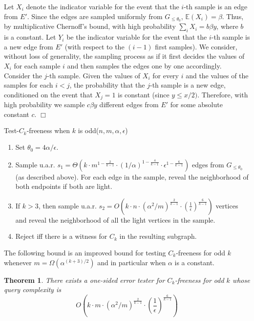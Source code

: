 \documentclass{article}
\newcommand{\Ex}{\mathbb{E}}
\newenvironment{proof}{\smallskip\noindent{\bf Proof:}}%
        {\hspace*{\fill}$\Box$\par}
\newtheorem{theorem}{Theorem}
\begin{document}
\begin{proof}
    Let $X_i$ denote the indicator variable for the event that the $i$-th sample is an edge from $E'$. Since the edges are sampled uniformly from $G_{\leq \theta_0}$, $\Ex(X_i) = \beta$.
    Thus, by multiplicative Chernoff's bound, with high probability $\sum_i X_i = b \beta y$, where $b$ is a constant.
    Let $Y_i$ be the indicator variable for the event that the $i$-th sample is a new edge from $E'$ (with respect to the $(i-1)$ first samples).
    We consider, without loss of generality, the sampling process as if it first decides the values of $X_i$ for each sample $i$ and then samples the edges one by one accordingly.
    Consider the $j$-th sample.
    Given the values of $X_i$ for every $i$ and the values of the samples for each $i < j$, the probability that the $j$-th sample is a new edge, conditioned on the event that $X_j = 1$ is constant (since $y \leq x/2)$. Therefore, with high probability we sample $c \beta y$ different edges from $E'$ for some absolute constant $c$.
\end{proof}


\bigskip
\textsf{Test-$C_k$-freeness when $k$ is odd}($n, m, \alpha, \epsilon$)
\begin{enumerate}
\item Set $\theta_0 = 4\alpha/\epsilon$.
\item Sample u.a.r. $s_1 = \Theta \left(k \cdot m^{1-\frac{2}{k-1}} \cdot (1/\alpha)^{1-\frac{4}{k-1}} \cdot \epsilon^{1-\frac{6}{k-1}}\right)$ edges from $G_{\leq \theta_0}$ (as described above).
For each edge in the sample,  reveal the neighborhood of both endpoints if both are light.
\item If $k > 3$, then sample u.a.r. $s_2 = O\left(k \cdot n \cdot (\alpha^2/m)^{\frac{2}{k-1}} \cdot \left( \frac{1}{\epsilon}\right)^{\frac{6}{k-1}} \right)$ vertices and reveal the neighborhood of all the light vertices in the sample.
\item Reject iff there is a witness for $C_k$ in the resulting subgraph.
\end{enumerate}

The following bound is an improved bound for testing $C_k$-freeness for odd $k$ whenever $m = \Omega(\alpha^{(k+3)/2})$ and in particular when $\alpha$ is a constant.
\begin{theorem}\label{thm:Ck-ub-odd-k}
There exists a one-sided error tester for $C_k$-freeness for odd $k$ whose query complexity is
$$O\left(k \cdot m \cdot (\alpha^2/m)^{\frac{2}{k-1}} \cdot \left( \frac{1}{\epsilon}\right)^{\frac{6}{k-1}} \right)$$
\end{theorem}
\end{document}
